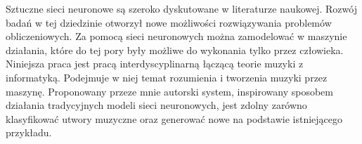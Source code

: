 \noindent Sztuczne sieci neuronowe są szeroko dyskutowane w literaturze naukowej. Rozwój badań w tej dziedzinie otworzył nowe możliwości rozwiązywania problemów obliczeniowych. Za pomocą sieci neuronowych można zamodelować w maszynie działania, które do tej pory były możliwe do wykonania tylko przez człowieka. 
Niniejsza praca jest pracą interdyscyplinarną łączącą teorie muzyki z informatyką. Podejmuje w niej temat rozumienia i tworzenia muzyki przez maszynę. Proponowany przeze mnie autorski system, inspirowany sposobem działania tradycyjnych modeli sieci neuronowych, jest zdolny zarówno klasyfikować utwory muzyczne oraz generować nowe na podstawie istniejącego przykładu.